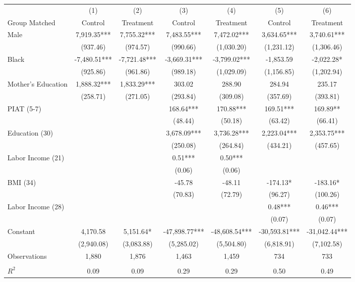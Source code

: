 \begin{tabular}{lcccccc} \toprule
 & (1) & (2) & (3) & (4) & (5) & (6) \\ 
Group Matched & Control & Treatment & Control & Treatment & Control & Treatment \\ \midrule
Male & 7,919.35*** & 7,755.32*** & 7,483.55*** & 7,472.02*** & 3,634.65*** & 3,740.61*** \\
 & (937.46) & (974.57) & (990.66) & (1,030.20) & (1,231.12) & (1,306.46) \\
Black  & -7,480.51*** & -7,721.48*** & -3,669.31*** & -3,799.02*** & -1,853.59 & -2,022.28* \\
 & (925.86) & (961.86) & (989.18) & (1,029.09) & (1,156.85) & (1,202.94) \\
Mother's Education & 1,888.32*** & 1,833.29*** & 303.02 & 288.90 & 284.94 & 235.17 \\
 & (258.71) & (271.05) & (293.84) & (309.08) & (357.69) & (393.81) \\
PIAT (5-7) &  &  & 168.64*** & 170.88*** & 169.51*** & 169.89** \\
 &  &  & (48.44) & (50.18) & (63.42) & (66.41) \\
Education (30)  &  &  & 3,678.09*** & 3,736.28*** & 2,223.04*** & 2,353.75*** \\
 &  &  & (250.08) & (264.84) & (434.21) & (457.65) \\
Labor Income (21) &  &  & 0.51*** & 0.50*** &  &  \\
 &  &  & (0.06) & (0.06) &  &  \\
BMI (34) &  &  & -45.78 & -48.11 & -174.13* & -183.16* \\
 &  &  & (70.83) & (72.79) & (96.27) & (100.26) \\
Labor Income (28) &  &  &  &  & 0.48*** & 0.46*** \\
 &  &  &  &  & (0.07) & (0.07) \\
Constant & 4,170.58 & 5,151.64* & -47,898.77*** & -48,608.54*** & -30,593.81*** & -31,042.44*** \\
 & (2,940.08) & (3,083.88) & (5,285.02) & (5,504.80) & (6,818.91) & (7,102.58) \\
 Observations & 1,880 & 1,876 & 1,463 & 1,459 & 734 & 733 \\ \\ \midrule
$R^2$ & 0.09 & 0.09 & 0.29 & 0.29 & 0.50 & 0.49 \\ \bottomrule
\end{tabular}
